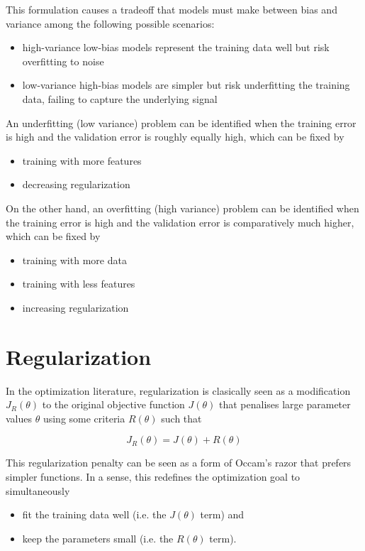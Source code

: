 This formulation causes a tradeoff that models must make between bias and variance among the following possible scenarios:

\begin{itemize}
    \item high-variance low-bias models represent the training data well but risk overfitting to noise
    \item low-variance high-bias models are simpler but risk underfitting the training data, failing to capture the underlying signal
\end{itemize}

An underfitting (low variance) problem can be identified when the training error is high and the validation error is roughly equally high, which can be fixed by

\begin{itemize}
    \item training with more features
    \item decreasing regularization
\end{itemize}

On the other hand, an overfitting (high variance) problem can be identified when the training error is high and the validation error is comparatively much higher, which can be fixed by

\begin{itemize}
    \item training with more data
    \item training with less features
    \item increasing regularization
\end{itemize}

\section{Regularization}

In the optimization literature, regularization is clasically seen as a modification $J_R(\theta)$ to the original objective function $J(\theta)$ that penalises large parameter values $\theta$ using some criteria $R(\theta)$ such that

$$
J_R(\theta) = J(\theta) + R(\theta)
$$

This regularization penalty can be seen as a form of Occam's razor that prefers simpler functions. In a sense, this redefines the optimization goal to simultaneously

\begin{itemize}
    \item fit the training data well (i.e. the $J(\theta)$ term) and
    \item keep the parameters small (i.e. the $R(\theta)$ term).
\end{itemize}

